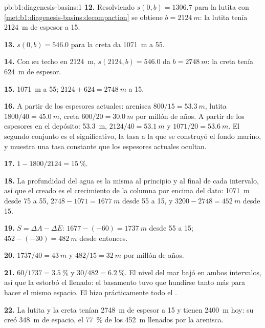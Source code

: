 \begin{solution}{pb:b1:diagenesis-basins:1}
\textbf{12.} Resolviendo $s(0, b) = 1306.7$ para la lutita con
\cref{met:b1:diagenesis-basins:decompaction} se obtiene $b = \qty{2124}{m}$: la lutita tenía \qty{2124}{m} de espesor a \qty{15}{\Ma}.

\textbf{13.} $s(0, b) = 546.0$ para la creta da \qty{1071}{m} a \qty{55}{\Ma}.

\textbf{14.} Con su techo en \qty{2124}{m}, $s(2124, b) = 546.0$ da $b =
\qty{2748}{m}$: la creta tenía \qty{624}{m} de espesor.

\textbf{15.} \qty{1071}{m} a \qty{55}{\Ma}; $2124 + 624 = \qty{2748}{m}$ a \qty{15}{\Ma}.

\textbf{16.} A partir de los espesores actuales: arenisca $800/15 = \qty{53.3}{m}$,
lutita $1800/40 = \qty{45.0}{m}$, creta $600/20 = \qty{30.0}{m}$ por millón de años. A partir de los espesores en el depósito: \qty{53.3}{m}, $2124/40 =
\qty{53.1}{m}$ y $1071/20 = \qty{53.6}{m}$. El segundo conjunto es el significativo, la tasa a la que se construyó el fondo marino, y muestra una tasa constante que los espesores actuales ocultan.

\textbf{17.} $1 - 1800/2124 = \qty{15}{\%}$.

\textbf{18.} La profundidad del agua es la misma al principio y al final de cada intervalo, así que el  creado es el crecimiento de la
columna por encima del dato: \qty{1071}{m} desde 75 a \qty{55}{\Ma}, $2748 - 1071 = \qty{1677}{m}$ desde 55 a \qty{15}{\Ma}, y $3200 - 2748 = \qty{452}{m}$ desde \qty{15}{\Ma}.

\textbf{19.} $S = \Delta A - \Delta E$: $1677 - (-60) = \qty{1737}{m}$ desde 55 a \qty{15}{\Ma}; $452 - (-30) = \qty{482}{m}$ desde entonces.

\textbf{20.} $1737/40 = \qty{43}{m}$ y $482/15 = \qty{32}{m}$ por millón de años.

\textbf{21.} $60/1737 = \qty{3.5}{\%}$ y $30/482 = \qty{6.2}{\%}$. El nivel del mar bajó en ambos intervalos, así que la  estorbó el llenado: el basamento tuvo que hundirse
tanto más para hacer el mismo espacio. El  hizo prácticamente todo el .

\textbf{22.} La lutita y la creta tenían \qty{2748}{m} de espesor a \qty{15}{\Ma} y tienen \qty{2400}{m} hoy: su  creó \qty{348}{m} de espacio,
el \qty{77}{\%} de los \qty{452}{m} llenados por la arenisca.


\end{solution}
